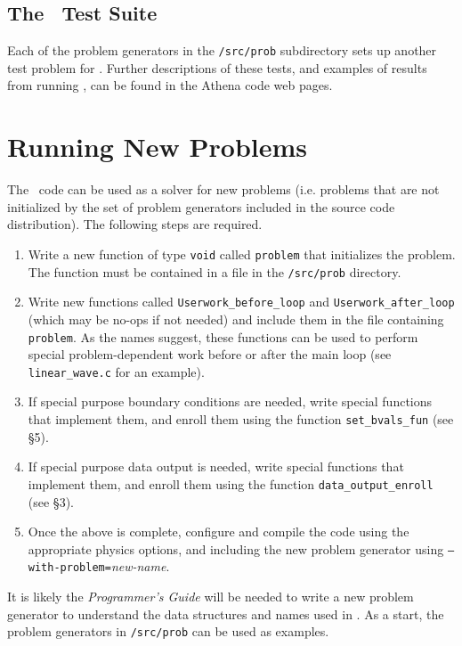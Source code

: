 \subsection{The \ath\ Test Suite}

Each of the problem generators in the {\tt /src/prob} subdirectory sets
up another test problem for \ath.  Further descriptions of these tests, and
examples of results from running \ath, can be found in the Athena code 
web pages.
  
\section{Running New Problems}

The \ath\ code can be used as a solver for new problems (i.e. problems that
are not initialized by the set of problem generators included in the source
code distribution).  The following steps are required.
\begin{enumerate}
\item Write a new function of type {\tt void} called {\tt problem} that initializes the problem.
The function must be contained in a file in the {\tt /src/prob} directory.
\item Write new functions called {\tt Userwork\_before\_loop} and 
{\tt Userwork\_after\_loop} (which may be no-ops if not needed) and include
them in the file containing {\tt problem}.  As the names suggest, these
functions can be used to perform special problem-dependent work before or 
after the main loop (see {\tt linear\_wave.c} for an example).
\item If special purpose boundary conditions are needed, write special
functions that implement them, and enroll them using the function
{\tt set\_bvals\_fun} (see \S 5).
\item If special purpose data output is needed, write special
functions that implement them, and enroll them using the function
{\tt data\_output\_enroll} (see \S 3).
\item Once the above is complete, configure and compile the code
using the appropriate physics options, and including the new problem
generator using {\tt --with-problem=}{\em new-name}.
\end{enumerate}

It is likely the {\em Programmer's Guide} will be needed to write a 
new problem generator to understand the data structures and names used
in \ath.  As a start, the problem generators in {\tt /src/prob} can be used
as examples.


